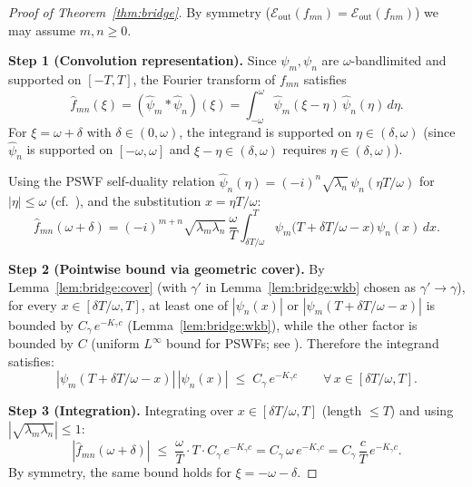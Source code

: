 \begin{proof}[Proof of Theorem~\ref{thm:bridge}]
By symmetry ($\mathcal{E}_{\mathrm{out}}(f_{mn}) =
\mathcal{E}_{\mathrm{out}}(f_{nm})$) we may assume $m, n \ge 0$.

\textbf{Step 1 (Convolution representation).}
Since $\psi_m, \psi_n$ are $\omega$-bandlimited and supported on
$[-T, T]$, the Fourier transform of $f_{mn}$ satisfies
\[
  \widehat{f}_{mn}(\xi)
  = (\widehat{\psi}_m * \widehat{\psi}_n)(\xi)
  = \int_{-\omega}^{\omega}
    \widehat{\psi}_m(\xi - \eta)\,\widehat{\psi}_n(\eta)\,d\eta.
\]
For $\xi = \omega + \delta$ with $\delta \in (0, \omega)$,
the integrand is supported on $\eta \in (\delta, \omega)$
(since $\widehat{\psi}_n$ is supported on $[-\omega, \omega]$ and
$\xi - \eta \in (\delta, \omega)$ requires $\eta \in (\delta, \omega)$).

Using the PSWF self-duality relation
$\widehat{\psi}_n(\eta) = (-i)^n \sqrt{\lambda_n}\,\psi_n(\eta T/\omega)$
for $|\eta| \le \omega$
(cf.\ \cite[§2.3, eq.~(2.37)]{OsipovRokhlinXiao}),
and the substitution $x = \eta T/\omega$:
\begin{equation}
\label{eq:bridge:conv-x}
  \widehat{f}_{mn}(\omega + \delta)
  = (-i)^{m+n}\sqrt{\lambda_m \lambda_n}\,
    \frac{\omega}{T}
    \int_{\delta T/\omega}^{T}
    \psi_m\!\bigl(T + \delta T/\omega - x\bigr)\,
    \psi_n(x)\,dx.
\end{equation}

\textbf{Step 2 (Pointwise bound via geometric cover).}
By Lemma~\ref{lem:bridge:cover} (with $\gamma'$ in
Lemma~\ref{lem:bridge:wkb} chosen as $\gamma' \to \gamma$),
for every $x \in [\delta T/\omega, T]$,
at least one of $|\psi_n(x)|$ or
$|\psi_m(T + \delta T/\omega - x)|$ is bounded by
$C_{\gamma}\,e^{-K_\gamma c}$ (Lemma~\ref{lem:bridge:wkb}),
while the other factor is bounded by $C$ (uniform $L^\infty$
bound for PSWFs; see \cite[Corollary~4.3]{OsipovRokhlinXiao}).
Therefore the integrand satisfies:
\[
  |\psi_m(T + \delta T/\omega - x)|\,|\psi_n(x)|
  \;\le\;
  C_\gamma\,e^{-K_\gamma c}
  \qquad\forall\, x \in [\delta T/\omega, T].
\]

\textbf{Step 3 (Integration).}
Integrating over $x \in [\delta T/\omega, T]$ (length $\le T$)
and using $|\sqrt{\lambda_m \lambda_n}| \le 1$:
\begin{equation}
\label{eq:bridge:pointwise-xi}
  |\widehat{f}_{mn}(\omega + \delta)|
  \;\le\;
  \frac{\omega}{T} \cdot T \cdot C_\gamma\,e^{-K_\gamma c}
  = C_\gamma\,\omega\,e^{-K_\gamma c}
  = C_\gamma\,\frac{c}{T}\,e^{-K_\gamma c}.
\end{equation}
By symmetry, the same bound holds for $\xi = -\omega - \delta$.


\end{proof}
